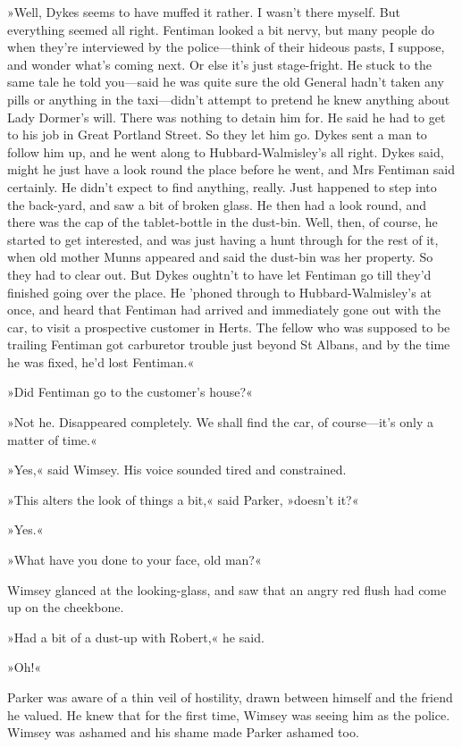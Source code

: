 »Well, Dykes seems to have muffed it rather. I wasn't there myself. But everything seemed all right. Fentiman looked a bit nervy, but many people do when they're interviewed by the police—think of their hideous pasts, I suppose, and wonder what's coming next. Or else it's just stage-fright. He stuck to the same tale he told you—said he was quite sure the old General hadn't taken any pills or anything in the taxi—didn't attempt to pretend he knew anything about Lady Dormer's will. There was nothing to detain him for. He said he had to get to his job in Great Portland Street. So they let him go. Dykes sent a man to follow him up, and he went along to Hubbard-Walmisley's all right. Dykes said, might he just have a look round the place before he went, and Mrs Fentiman said certainly. He didn't expect to find anything, really. Just happened to step into the back-yard, and saw a bit of broken glass. He then had a look round, and there was the cap of the tablet-bottle in the dust-bin. Well, then, of course, he started to get interested, and was just having a hunt through for the rest of it, when old mother Munns appeared and said the dust-bin was her property. So they had to clear out. But Dykes oughtn't to have let Fentiman go till they'd finished going over the place. He 'phoned through to Hubbard-Walmisley's at once, and heard that Fentiman had arrived and immediately gone out with the car, to visit a prospective customer in Herts. The fellow who was supposed to be trailing Fentiman got carburetor trouble just beyond St Albans, and by the time he was fixed, he'd lost Fentiman.«

»Did Fentiman go to the customer's house?«

»Not he. Disappeared completely. We shall find the car, of course—it's only a matter of time.«

»Yes,« said Wimsey. His voice sounded tired and constrained.

»This alters the look of things a bit,« said Parker, »doesn't it?«

»Yes.«

»What have you done to your face, old man?«

Wimsey glanced at the looking-glass, and saw that an angry red flush had come up on the cheekbone.

»Had a bit of a dust-up with Robert,« he said.

»Oh!«

Parker was aware of a thin veil of hostility, drawn between himself and the friend he valued. He knew that for the first time, Wimsey was seeing him as the police. Wimsey was ashamed and his shame made Parker ashamed too.

